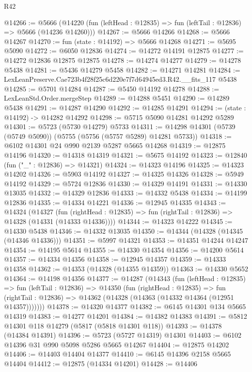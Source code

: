 \begin{lexlean}{R42}
\begin{coremodule}
@14266 := @5666
    (@14220 (fun (leftHead : @12835) => fun (leftTail : @12836) => @5666 (@14236 @14260)))
@14267 := @5666 @14266
@14268 := @5666 @14267
@14270 := fun (state : @14192) => @5666 @14268
@14271 := @5695 @5090
@14272 := @6050 @12836
@14274 := @14272 @14191 @12875
@14277 := @14272 @12836 @12875 @12875
@14278 := @14274 @14277
@14279 := @14278 @5438
@14281 := @5436 @14279 @5458
@14282 := @14271 @14281
@14284 := LexLeanPreserve.Cae723b4f28f25c6d220e7f7d64945ed3.R42.__fits_117 @5438
@14285 := @5701 @14284
@14287 := @5450 @14192 @14278
@14288 := LexLeanStd.Order.mergeStep
@14289 := @14288 @5451
@14290 := @14289 @5438
@14291 := @14287 @14290
@14292 := @14285 @14291
@14294 := (state : @14192) -> @14282 @14292
@14298 := @5715 @5090 @14281 @14292 @5289
@14301 := @5723 (@5730 @14279) @5733
@14311 := @14298 @14301 (@5739 (@5749 @5090)) (@5755 (@5756 (@5757 @5289) @14281 @5733))
@14318 := @6102 @14301 @24 @990 @2139 @5287 @5665 @14268
@14319 := @12875 @14196
@14320 := @14318 @14319
@14321 := @5675 @14192
@14323 := @12840 (fun ("_" : @12836) => @14321)
@14324 := @14323 @14196
@14325 := @14323 @14202
@14326 := @5903 @14192
@14327 := @14325 @14326
@14328 := @5949 @14192
@14329 := @5724 @12836
@14330 := @14329 @14191
@14331 := @14330 @13035
@14332 := @14329 @12836
@14333 := @14332 @5438
@14334 := @14199 @12836
@14335 := @14334 @14221
@14336 := @12945 @14335
@14343 := @14324
    (@14327
      (fun (rightHead : @12835) => fun (rightTail : @12836) => @14328 (@14331 (@14333 @14336))))
@14344 := @14323 @14222
@14345 := @14330 @5438
@14346 := @14332 @13035
@14350 := @14344 (@14328 (@14345 (@14346 @14336)))
@14351 := @5997 @14321
@14353 := @14351 @14244 @14247
@14354 := @14195 @5614
@14355 := @14330 @14354
@14356 := @14200 @5614
@14357 := @14334 @14356
@14358 := @12945 @14357
@14359 := @14333 @14358
@14362 := @14353 (@14328 (@14355 @14359))
@14363 := @14330 @5652
@14364 := @14198 @14356
@14377 := @14287
    (@14343
      (fun (leftHead : @12835) =>
      fun (leftTail : @12836) =>
      @14350
        (fun (rightHead : @12835) =>
        fun (rightTail : @12836) => @14362 (@14328 (@14363 (@14332 @14364 (@12951 @14357)))))))
@14378 := @14320 @14377
@14382 := @6145 @14301 @134 @5665 @14319
@14383 := @14277 @14201
@14384 := @14382 @14383
@14391 := @5812 @14301 @118 @14279 (@5817 (@5818 @14301 @118))
@14393 := @14378 (@14384 @14391)
@14396 := @5723 (@5727 @14319) @14301
@14403 := @6102 @14396 @31 @990 @5098 @5286 @5665 @14267
@14404 := @12875 @14202
@14406 := @14403 @14404 @14377
@14410 := @6145 @14396 @2158 @5665 @14404
@14412 := @12875 (@14334 @14201)
@14428 := @14406

\end{coremodule}
\end{lexlean}
